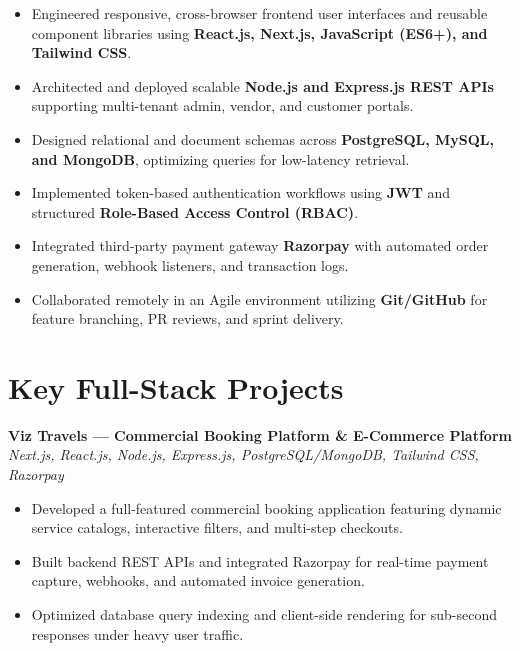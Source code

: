 \documentclass[a4paper,10pt]{article}
\begin{document}
\begin{itemize}

    \item Engineered responsive, cross-browser frontend user interfaces and reusable component libraries using \textbf{React.js, Next.js, JavaScript (ES6+), and Tailwind CSS}.

    \item Architected and deployed scalable \textbf{Node.js and Express.js REST APIs} supporting multi-tenant admin, vendor, and customer portals.

    \item Designed relational and document schemas across \textbf{PostgreSQL, MySQL, and MongoDB}, optimizing queries for low-latency retrieval.

    \item Implemented token-based authentication workflows using \textbf{JWT} and structured \textbf{Role-Based Access Control (RBAC)}.

    \item Integrated third-party payment gateway \textbf{Razorpay} with automated order generation, webhook listeners, and transaction logs.

    \item Collaborated remotely in an Agile environment utilizing \textbf{Git/GitHub} for feature branching, PR reviews, and sprint delivery.

\end{itemize}

\section*{Key Full-Stack Projects}

\textbf{Viz Travels --- Commercial Booking Platform \& E-Commerce Platform}
\hfill
\textit{Next.js, React.js, Node.js, Express.js, PostgreSQL/MongoDB, Tailwind CSS, Razorpay}

\begin{itemize}

    \item Developed a full-featured commercial booking application featuring dynamic service catalogs, interactive filters, and multi-step checkouts.

    \item Built backend REST APIs and integrated Razorpay for real-time payment capture, webhooks, and automated invoice generation.

    \item Optimized database query indexing and client-side rendering for sub-second responses under heavy user traffic.

\end{itemize}
\end{document}
